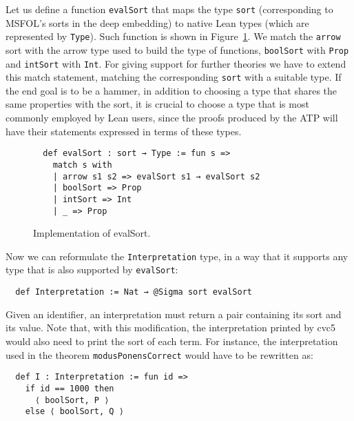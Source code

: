 Let us define a function \texttt{evalSort} that maps the type \texttt{sort}
(corresponding to MSFOL's sorts in the deep embedding) to native Lean types
(which are represented by \texttt{Type}). Such function is shown in Figure~\ref{impEvalSort}.
We match the \texttt{arrow} sort with the arrow type used to build the type of
functions, \texttt{boolSort} with \texttt{Prop} and \texttt{intSort} with \texttt{Int}.
For giving support for further theories we have to extend this match statement,
matching the corresponding \texttt{sort} with a suitable type.
If the end goal is to be a hammer, in addition to choosing a type that shares the
same properties with the sort, it is crucial to choose a type that is most commonly
employed by Lean users, since the proofs produced by the ATP will have their
statements expressed in terms of these types.

\begin{figure}[t]
\begin{verbatim}
  def evalSort : sort → Type := fun s =>
    match s with
    | arrow s1 s2 => evalSort s1 → evalSort s2
    | boolSort => Prop
    | intSort => Int
    | _ => Prop
\end{verbatim}
\caption{Implementation of evalSort.}\label{impEvalSort}
\end{figure}

Now we can reformulate the \texttt{Interpretation} type, in a way that
it supports any type that is also supported by \texttt{evalSort}:

\begin{verbatim}
  def Interpretation := Nat → @Sigma sort evalSort
\end{verbatim}

Given an identifier, an interpretation must return a pair containing its sort
and its value. Note that, with this modification, the interpretation printed
by cvc5 would also need to print the sort of each term. For instance,
the interpretation used in the theorem \texttt{modusPonensCorrect} would have
to be rewritten as:

\begin{verbatim}
  def I : Interpretation := fun id =>
    if id == 1000 then
      ⟨ boolSort, P ⟩
    else ⟨ boolSort, Q ⟩
\end{verbatim}

